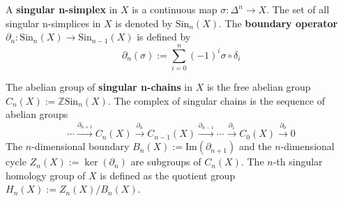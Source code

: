 \documentclass[12pt, oneside]{book}
\begin{document}
\section{}
\begin{definition}
    A \textbf{singular n-simplex} in $X$ is a continuous map $\sigma: \Delta^n \to X$. The set of all singular n-simplices in $X$ is denoted by $\mathrm{Sin}_n(X)$.
    The \textbf{boundary operator} $\partial_n: \mathrm{Sin}_n(X) \to \mathrm{Sin}_{n-1}(X)$ is defined by
    \begin{equation*}
        \partial_n(\sigma) := \sum_{i=0}^{n}(-1)^i\sigma\circ \delta_i
    \end{equation*}




\end{definition}


\begin{definition}
    The abelian group of \textbf{singular n-chains} in $X$ is the free abelian group $C_n(X):= \mathbb{Z}\mathrm{Sin}_n(X)$.
    The complex of singular chains is the sequence of abelian groups
    \begin{equation*}
        \cdots \xrightarrow{\partial_{n+1}} C_n(X) \xrightarrow{\partial_n} C_{n-1}(X) \xrightarrow{\partial_{n-1}} \cdots \xrightarrow{\partial_1} C_0(X) \xrightarrow{\partial_0} 0
    \end{equation*}
    The $n$-dimensional boundary $B_n(X):= \mathrm{Im}(\partial_{n+1})$ and the $n$-dimensional cycle $Z_n(X):= \ker(\partial_n)$ are subgroups of $C_n(X)$.
    The $n$-th singular homology group of $X$ is defined as the quotient group $H_n(X):= Z_n(X)/B_n(X)$.
\end{definition}
\end{document}
